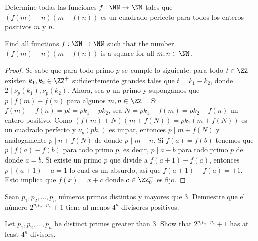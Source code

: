 \begin{probEG}
	Determine todas las funciones $f:\NN\to\NN$ tales que $(f(m)+n)(m+f(n))$ es un cuadrado perfecto para todos los enteros positivos $m$ y $n$.
	\begin{hint}
		Find all functions $f:\NN\to\NN$ such that the number $(f(m)+n)(m+f(n))$ is a square for all $m,n\in\NN$.
	\end{hint}
\end{probEG}

\begin{proof}
	Se sabe que para todo primo $p$ se cumple lo siguiente: para todo $t\in\ZZ$ existen $k_1,k_2\in\ZZ^+$ suficientemente grandes tales que $t=k_1-k_2$, donde $2\mid\nu_p(k_1),\nu_p(k_2)$. Ahora, sea $p$ un primo y supongamos que $p\mid f(m)-f(n)$ para algunos $m,n\in\ZZ^+$. Si $f(m)-f(n)=pt=pk_1-pk_2$, sea $N=pk_1-f(m)=pk_2-f(n)$ un entero positivo. Como $(f(m)+N)(m+f(N))=pk_1(m+f(N))$ es un cuadrado perfecto y $\nu_p(pk_1)$ es impar, entonces $p\mid m+f(N)$ y análogamente $p\mid n+f(N)$ de donde $p\mid m-n$. Si $f(a)=f(b)$ tenemos que $p\mid f(a)-f(b)$ para todo primo $p$, es decir, $p\mid a-b$ para todo primo $p$ de donde $a=b$. Si existe un primo $p$ que divide a $f(a+1)-f(a)$, entonces $p\mid (a+1)-a=1$ lo cual es un absurdo, así que $f(a+1)-f(a)=\pm 1$. Esto implica que $f(x)=x+c$ donde $c\in\ZZ^+_0$ es fijo.
\end{proof}

\begin{probEG}[ISL 2002/N3]
	Sean $p_1,p_2,\dots,p_n$ números primos distintos y mayores que $3$. Demuestre que el número $2^{p_1p_2\cdots p_n}+1$ tiene al menos $4^n$ divisores positivos.
	\begin{hint}
		Let $p_1,p_2,\dots,p_n$ be distinct primes greater than $3$. Show that $2^{p_1p_2\cdots p_n}+1$ has at least $4^n$ divisors.
	\end{hint}
\end{probEG}


